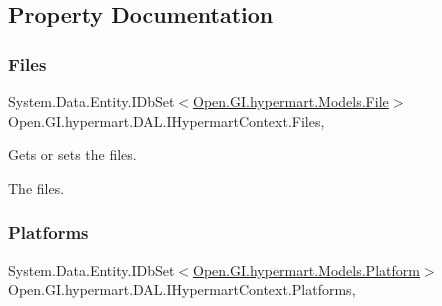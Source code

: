 \subsection{Property Documentation}
\hypertarget{interface_open_1_1_g_i_1_1hypermart_1_1_d_a_l_1_1_i_hypermart_context_a43675ffb78127ee6af56534c51d593c5}{}\label{interface_open_1_1_g_i_1_1hypermart_1_1_d_a_l_1_1_i_hypermart_context_a43675ffb78127ee6af56534c51d593c5} 
\subsubsection{\texorpdfstring{Files}{Files}}
{\footnotesize\ttfamily System.\+Data.\+Entity.\+I\+Db\+Set$<$\hyperlink{class_open_1_1_g_i_1_1hypermart_1_1_models_1_1_file}{Open.\+G\+I.\+hypermart.\+Models.\+File}$>$ Open.\+G\+I.\+hypermart.\+D\+A\+L.\+I\+Hypermart\+Context.\+Files\hspace{0.3cm}{\ttfamily [get]}, {\ttfamily [set]}}



Gets or sets the files. 

The files. \hypertarget{interface_open_1_1_g_i_1_1hypermart_1_1_d_a_l_1_1_i_hypermart_context_a555845fae4537e83a55b431d87b6642e}{}\label{interface_open_1_1_g_i_1_1hypermart_1_1_d_a_l_1_1_i_hypermart_context_a555845fae4537e83a55b431d87b6642e} 
\subsubsection{\texorpdfstring{Platforms}{Platforms}}
{\footnotesize\ttfamily System.\+Data.\+Entity.\+I\+Db\+Set$<$\hyperlink{class_open_1_1_g_i_1_1hypermart_1_1_models_1_1_platform}{Open.\+G\+I.\+hypermart.\+Models.\+Platform}$>$ Open.\+G\+I.\+hypermart.\+D\+A\+L.\+I\+Hypermart\+Context.\+Platforms\hspace{0.3cm}{\ttfamily [get]}, {\ttfamily [set]}}



